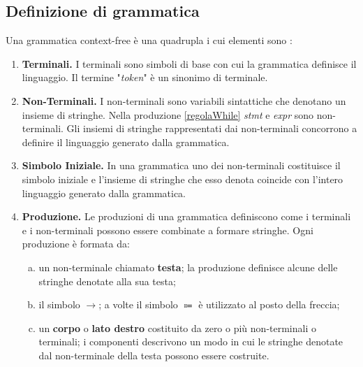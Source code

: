 \subsection{Definizione di grammatica}
Una grammatica context-free è una quadrupla i cui elementi sono \cite{libro: compilatori}:
\begin{enumerate}
	\item \textbf{Terminali. }I terminali sono simboli di base con cui la grammatica definisce il linguaggio. Il termine "\textit{token}" è un sinonimo di terminale.
	\item \textbf{Non-Terminali. }I non-terminali sono variabili sintattiche che denotano un insieme di stringhe. Nella produzione \ref{regolaWhile} \textit{stmt} e \textit{expr} sono non-terminali. Gli insiemi di stringhe rappresentati dai non-terminali concorrono a definire il linguaggio generato dalla grammatica.
	\item \textbf{Simbolo Iniziale. }In una grammatica uno dei non-terminali costituisce il simbolo iniziale e l'insieme di stringhe che esso denota coincide con l'intero linguaggio generato dalla grammatica. 
	\item \textbf{Produzione. }Le produzioni di una grammatica definiscono come i terminali e i non-terminali possono essere combinate a formare stringhe. Ogni produzione è formata da:
	\begin{enumerate}[(a)]
		\item un non-terminale chiamato \textbf{testa}; la produzione definisce alcune delle stringhe denotate alla sua testa;
		\item il simbolo $\to$; a volte il simbolo $\Coloneqq$ è utilizzato al posto della freccia;
		\item un \textbf{ corpo } o \textbf{lato destro} costituito da zero o più non-terminali o terminali; i componenti descrivono un modo in cui le stringhe denotate dal non-terminale della testa possono essere costruite.
	\end{enumerate}
\end{enumerate}
